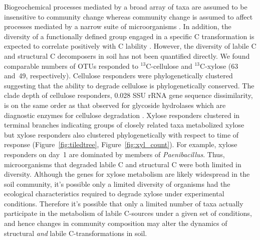 Biogeochemical processes mediated by a broad array of taxa are assumed to
be insensitive to community change whereas community change is assumed to
affect processes mediated by a narrow suite of microorganisms
\citep{Schimel_1995,McGuire2010}. In addition, the diversity of
a functionally defined group engaged in a specific C transformation is
expected to correlate positively with C lability \citep{McGuire2010}.
However, the diversity of labile C and structural C decomposers in soil
has not been quantified directly. We found comparable numbers of OTUs
responded to $^{13}$C-cellulose and $^{13}$C-xylose (63 and~49,
respectively). Cellulose responders were phylogenetically clustered
suggesting that the ability to degrade cellulose is phylogenetically
conserved. The clade depth of cellulose responders, 0.028 SSU rRNA gene
sequence dissimilarity, is on the same order as that observed for
glycoside hydrolases which are diagnostic enzymes for cellulose
degradation \citep{Berlemont2013}. Xylose responders clustered in terminal
branches indicating groups of closely related taxa metabolized xylose but
xylose responders also clustered phylogenetically with respect to time of
response (Figure~\ref{fig:tiledtree}, Figure~\ref{fig:xyl_count}).
For example, xylose responders on day~1 are dominated by members of
\textit{Paenibacillus}. Thus, microorganisms that degraded labile C and
structural C were both limited in diversity. Although the genes for xylose
metabolism are likely widespread in the soil community, it's possible only
a limited diversity of organisms had the ecological characteristics
required to degrade xylose under experimental conditions. Therefore it's
possible that only a limited number of taxa actually participate in the
metabolism of labile C-sources under a given set of conditions, and hence
changes in community composition may alter the dynamics of structural
\textit{and} labile C-transformations in soil.

